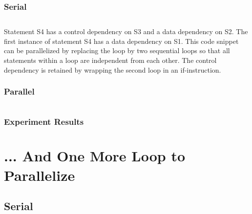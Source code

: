 \documentclass[parskip]{scrartcl}
\begin{document}
	\subsubsection{Serial}
	\inputminted	[linenos]{c}{ex2/c_ser.h}
	
	Statement S4 has a control dependency on S3 and a data dependency on S2. The first instance of statement S4 has a data dependency on S1. This code snippet can be parallelized by replacing the loop by two sequential loops so that all statements within a loop are independent from each other. The control dependency is retained by wrapping the second loop in an if-instruction.
	\subsubsection{Parallel}
	\inputminted	[linenos]{c}{ex2/c_par.h}
	\subsubsection{Experiment Results}
	
	\section{... And One More Loop to Parallelize}
	\subsection{Serial}
	\inputminted	[linenos]{c}{ex3/serial.c}
\end{document}
